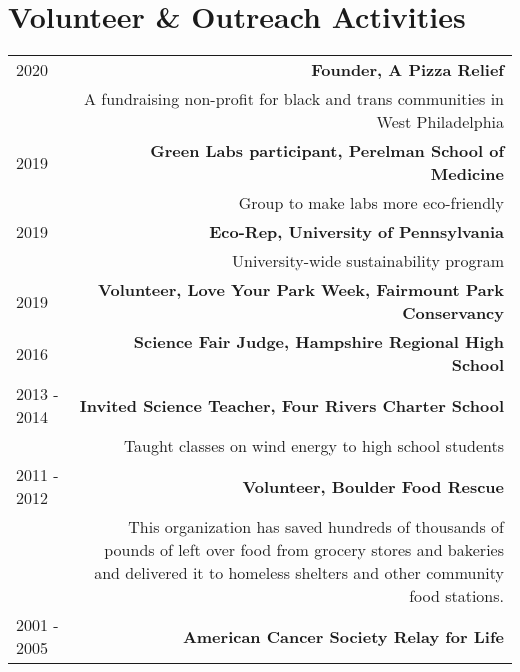 \section*{Volunteer \& Outreach Activities}
\begin{tabular}{L!{\VRule}R}
    2020& \textbf{Founder, A Pizza Relief} \\ 
    & A fundraising non-profit for black and trans communities in West Philadelphia\\ 
    2019& \textbf{Green Labs participant, Perelman School of Medicine}\\
        & Group to make labs more eco-friendly \\
    2019& \textbf{Eco-Rep, University of Pennsylvania}\\
        & University-wide sustainability program \\
    2019& \textbf{Volunteer, Love Your Park Week, Fairmount Park Conservancy}\\
    2016& \textbf{Science Fair Judge, Hampshire Regional High School} \\
    2013 - 2014& \textbf{Invited Science Teacher, Four Rivers Charter School}\\
                & Taught classes on wind energy to high school students\\
    2011 - 2012& \textbf{Volunteer, Boulder Food Rescue}\\
& This organization has saved hundreds of thousands of pounds of left over food from grocery stores and bakeries and delivered it to homeless shelters and other community food stations. \\
    2001 - 2005& \textbf{American Cancer Society Relay for Life}\\
\end{tabular}
